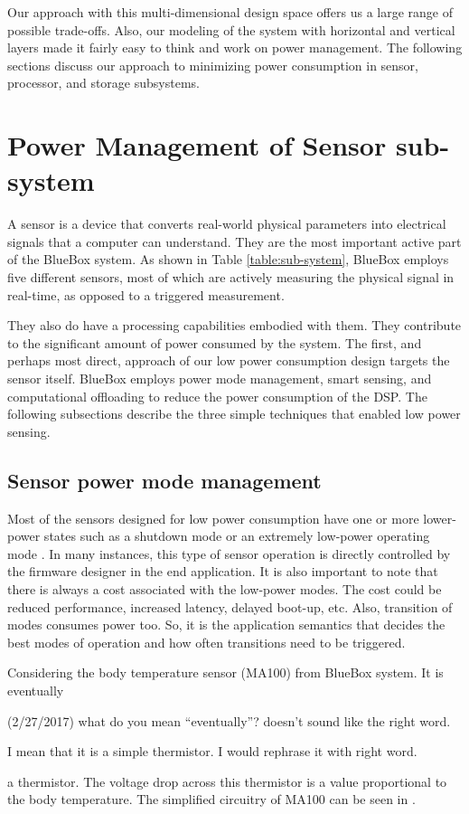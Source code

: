 
Our approach with this multi-dimensional design space offers us a
large range of possible trade-offs. Also, our modeling of the system
with horizontal and vertical layers made it fairly easy to think and
work on power management. The following sections discuss our approach
to minimizing power consumption in sensor, processor, and storage
subsystems.
 
 \section{Power Management of Sensor sub-system}
 
A sensor is a device that converts real-world physical parameters
into electrical signals that a computer can understand. They are the
most important active part of the BlueBox system. As shown in Table
\ref{table:sub-system}, BlueBox employs five different sensors, most
of which are actively measuring the physical signal in real-time, as
opposed to a triggered measurement.

They also do have a processing capabilities embodied with them. They
contribute to the significant amount of power consumed by the system.
The first, and perhaps most direct, approach of our low power
consumption design targets the sensor itself. BlueBox employs power
mode management, smart sensing, and computational offloading to
reduce the power consumption of the DSP. The following subsections
describe the three simple techniques that enabled low power sensing.

 \subsection{Sensor power mode management}

Most of the sensors designed for low power consumption have one or
more lower-power states such as a shutdown mode or an extremely
low-power operating mode \cite{lowpwrsensing}. In many instances,
this type of sensor operation is directly controlled by the firmware
designer in the end application. It is also important to note that
there is always a cost associated with the low-power modes.  The cost
could be reduced performance, increased latency, delayed boot-up,
etc. Also, transition of modes consumes power too. So, it is the
application semantics that decides the best modes of operation and
how often transitions need to be triggered. 
 
Considering the body temperature sensor (MA100) from BlueBox system.
It is eventually
\begin{cmtPai}
	(2/27/2017) what do you mean ``eventually''?  doesn't sound like
	the right word.
\end{cmtPai}
\begin{cmtSMS}
	I mean that it is a simple thermistor. I would rephrase it with right word.
\end{cmtSMS}
a thermistor. The voltage drop across this thermistor is a value
proportional to the body temperature. The simplified circuitry of
MA100 can be seen in .

